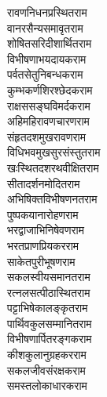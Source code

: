 \begin{large}
\begin{multicols}{2}
रावणनिधनप्रस्थित\hfill राम\\
वानरसैन्यसमावृत\hfill राम\\
शोषितसरिदीशार्थित\hfill राम\\
विभीषणाभयदायक\hfill राम\\
पर्वतसेतुनिबन्धक\hfill राम\\
कुम्भकर्णशिरश्छेदक\hfill राम\\
राक्षससङ्घविमर्दक\hfill राम\\
अहिमहिरावणचारण\hfill राम\\
संहृतदशमुखरावण\hfill राम\\
विधिभवमुखसुरसंस्तुत\hfill राम\\
खःस्थितदशरथवीक्षित\hfill राम\\
सीतादर्शनमोदित\hfill राम\\
अभिषिक्तविभीषणनत\hfill राम\\
पुष्पकयानारोहण\hfill राम\\
भरद्वाजाभिनिषेवण\hfill राम\\
भरतप्राणप्रियकर\hfill राम\\
साकेतपुरीभूषण\hfill राम\\
सकलस्वीयसमानत\hfill राम\\
रत्नलसत्पीठास्थित\hfill राम\\
पट्टाभिषेकालङ्कृत\hfill राम\\
पार्थिवकुलसम्मानित\hfill राम\\
विभीषणार्पितरङ्गक\hfill राम\\
कीशकुलानुग्रहकर\hfill राम\\
सकलजीवसंरक्षक\hfill राम\\
समस्तलोकाधारक\hfill राम\\
\jaya


\end{multicols}
\end{large}

